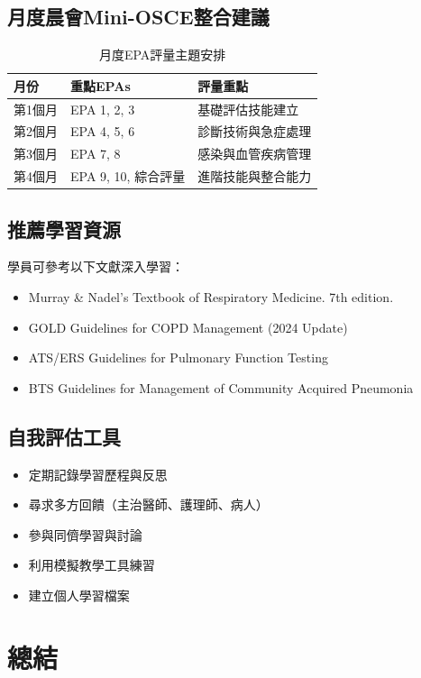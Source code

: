 \documentclass[12pt,a4paper]{article}
\begin{document}
\subsection{月度晨會Mini-OSCE整合建議}
\begin{table}[h]
    \centering
    \caption{月度EPA評量主題安排}
    \begin{tabular}{p{3cm} p{5cm} p{6cm}}
        \toprule
        \textbf{月份} & \textbf{重點EPAs} & \textbf{評量重點} \\
        \midrule
        第1個月 & EPA 1, 2, 3 & 基礎評估技能建立 \\
        第2個月 & EPA 4, 5, 6 & 診斷技術與急症處理 \\
        第3個月 & EPA 7, 8 & 感染與血管疾病管理 \\
        第4個月 & EPA 9, 10, 綜合評量 & 進階技能與整合能力 \\
        \bottomrule
    \end{tabular}
\end{table}

\subsection{推薦學習資源}
學員可參考以下文獻深入學習：
\begin{itemize}
    \item Murray \& Nadel's Textbook of Respiratory Medicine. 7th edition.
    \item GOLD Guidelines for COPD Management (2024 Update)
    \item ATS/ERS Guidelines for Pulmonary Function Testing
    \item BTS Guidelines for Management of Community Acquired Pneumonia
\end{itemize}

\subsection{自我評估工具}
\begin{itemize}[nosep]
    \item 定期記錄學習歷程與反思
    \item 尋求多方回饋（主治醫師、護理師、病人）
    \item 參與同儕學習與討論
    \item 利用模擬教學工具練習
    \item 建立個人學習檔案
\end{itemize}

\section{總結}
\end{document}
